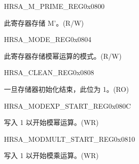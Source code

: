 \begin{register}{H}{RSA\_M\_PRIME\_REG}{0x0800}\label{regdesc:RSAMPRIMEREG}
%
\regnewline%
\begin{regdesc}\begin{reglist}
\item [RSA\_M\_PRIME\_REG] 此寄存器存储 M'。(R/W)
\end{reglist}\end{regdesc}
\end{register}

\begin{register}{H}{RSA\_MODE\_REG}{0x0804}\label{regdesc:RSAMODEXPMODEREG}
%
%
\regnewline%
\begin{regdesc}\begin{reglist}
\item [RSA\_MODE] 此寄存器存储模幂运算的模式。(R/W)
\end{reglist}\end{regdesc}
\end{register}


\begin{register}{H}{RSA\_CLEAN\_REG}{0x0808}\label{regdesc:RSACLEANREG}
%
%
\regnewline%
\begin{regdesc}\begin{reglist}
\item [RSA\_CLEAN] 一旦存储器初始化结束，此位为 1。(RO)
\end{reglist}\end{regdesc}
\end{register}


\begin{register}{H}{RSA\_MODEXP\_START\_REG}{0x080C}\label{regdesc:RSAMODEXPSTARTREG}
%
%
\regnewline%
\begin{regdesc}\begin{reglist}
\item [RSA\_MODEXP\_START] 写入 1 以开始模幂运算。(WR)
\end{reglist}\end{regdesc}
\end{register}


\begin{register}{H}{RSA\_MODMULT\_START\_REG}{0x0810}\label{regdesc:RSAMODMULTSTARTREG}
%
%
\regnewline%
\begin{regdesc}\begin{reglist}
\item [RSA\_MODMULT\_START] 写入 1 以开始模乘运算。(WR)
\end{reglist}\end{regdesc}
\end{register}


